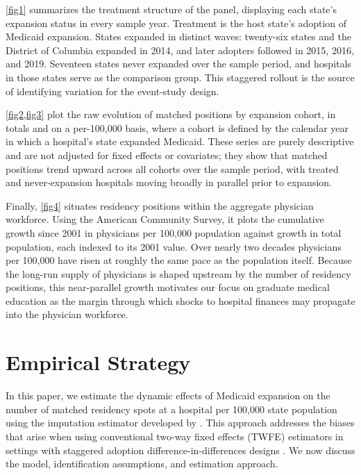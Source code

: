 \cref{fig1} summarizes the treatment structure of the panel, displaying each state's expansion status in every sample year. Treatment is the host state's adoption of Medicaid expansion. States expanded in distinct waves: twenty-six states and the District of Columbia expanded in 2014, and later adopters followed in 2015, 2016, and 2019. Seventeen states never expanded over the sample period, and hospitals in those states serve as the comparison group. This staggered rollout is the source of identifying variation for the event-study design.

\cref{fig2,fig3} plot the raw evolution of matched positions by expansion cohort, in totals and on a per-100{,}000 basis, where a cohort is defined by the calendar year in which a hospital's state expanded Medicaid. These series are purely descriptive and are not adjusted for fixed effects or covariates; they show that matched positions trend upward across all cohorts over the sample period, with treated and never-expansion hospitals moving broadly in parallel prior to expansion.

Finally, \cref{fig4} situates residency positions within the aggregate physician workforce. Using the American Community Survey, it plots the cumulative growth since 2001 in physicians per 100{,}000 population against growth in total population, each indexed to its 2001 value. Over nearly two decades physicians per 100{,}000 have risen at roughly the same pace as the population itself. Because the long-run supply of physicians is shaped upstream by the number of residency positions, this near-parallel growth motivates our focus on graduate medical education as the margin through which shocks to hospital finances may propagate into the physician workforce.

\section{Empirical Strategy}\label{sec:emp}
In this paper, we estimate the dynamic effects of Medicaid expansion on the number of matched residency spots at a hospital per 100,000 state population using the imputation estimator developed by \textcite{borusyak2024revisiting}. This approach addresses the biases that arise when using conventional two-way fixed effects (TWFE) estimators in settings with staggered adoption difference-in-differences designs \autocite{goodman2021difference, sun2021estimating,de2020two,roth2023s,de2023two}. We now discuss the model, identification assumptions, and estimation approach.
	
